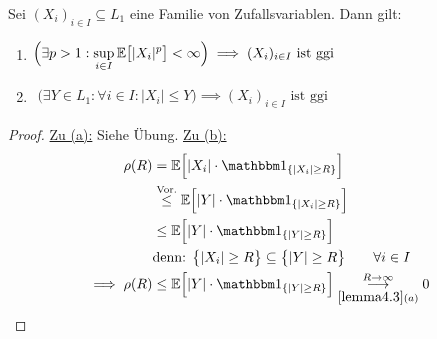\begin{theorem}\label{theorem4.4HinreichendeBeingungenFuerggi}\enter
Sei $(X_i)_{i\in I}\subseteq L_1$ eine Familie von Zufallsvariablen. Dann gilt:
\begin{enumerate}[label=(\alph*)]
\item $\begin{aligned}
\Big(\exists p>1:\sup\limits_{i\in I}\mathbb{E}\big[|X_i|^p\big]<\infty\Big)\implies (X_i)_{i\in I}\text{ ist ggi}
\end{aligned}$
\item $\begin{aligned}
\Big(\exists Y\in L_1:\forall i\in I:|X_i|\leq Y\Big)\implies(X_i)_{i\in I}\text{ ist ggi}
\end{aligned}$
\end{enumerate}
\end{theorem}
\begin{proof}
\underline{Zu (a):} Siehe Übung.\nl
\underline{Zu (b):}
\begin{align*}
	\rho(R)&=\E\Big[|X_i|\cdot\indi_{\lbrace |X_i|\geq R\rbrace}\Big] \\
&\stackrel{\text{Vor.}}{\leq} \E\Big[|Y|\cdot\indi_{\lbrace |X_i|\geq R\rbrace}\Big] \\
&\leq\E\Big[|Y|\cdot\indi_{\lbrace |Y|\geq R\rbrace}\Big]\\
&\text{denn: }\big\lbrace |X_i|\geq R\big\rbrace\subseteq\big\lbrace|Y|\geq R\big\rbrace\qquad\forall i\in I\\
\implies
\rho(R)
&\leq\E\Big[|Y|\cdot\indi_{\lbrace |Y|\geq R\rbrace}\Big]\underset{\ref{lemma4.3} (a)}{\overset{R\to\infty}{\longrightarrow}}0
\end{align*}
\end{proof}

